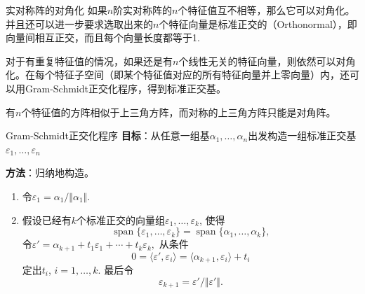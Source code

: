 
\begin{frame}

\begin{block}{实对称阵的对角化}
如果$n$阶实对称阵的$n$个特征值互不相等，那么它可以对角化。并且还可以进一步要求选取出来的$n$个特征向量是标准正交的（Orthonormal），即向量间相互正交，而且每个向量长度都等于1.

\vspace{1em}
\pause

对于有重复特征值的情况，如果还是有$n$个线性无关的特征向量，则依然可以对角化。在每个特征子空间（即某个特征值对应的所有特征向量并上零向量）内，还可以用Gram-Schmidt正交化程序，得到标准正交基。

\vspace{1em}
\pause

有$n$个特征值的方阵相似于上三角方阵，而对称的上三角方阵只能是对角阵。
\end{block}

\end{frame}


\begin{frame}

\begin{block}{Gram-Schmidt正交化程序}
{\bfseries 目标}：从任意一组基$\alpha_1, \ldots, \alpha_n$出发构造一组标准正交基$\varepsilon_1, \ldots, \varepsilon_n$

\vspace{1em}
\pause

{\bfseries 方法}：归纳地构造。
\begin{enumerate}
\item 令$\varepsilon_1 = \alpha_1 / \Vert \alpha_1 \Vert$.
\item 假设已经有$k$个标准正交的向量组$\varepsilon_1, \ldots, \varepsilon_k$, 使得
\[\operatorname{span}\{ \varepsilon_1, \ldots, \varepsilon_k \} = \operatorname{span}\{ \alpha_1, \ldots, \alpha_k \},\]
令$\varepsilon' = \alpha_{k+1} + t_1\varepsilon_1 + \cdots + t_k\varepsilon_k,$ 从条件
\[0 = \langle \varepsilon', \varepsilon_i \rangle = \langle \alpha_{k+1}, \varepsilon_i \rangle + t_i\]
定出$t_i$, $i=1,\ldots,k$. 最后令
\[\varepsilon_{k+1} = \varepsilon' / \Vert \varepsilon' \Vert.\]
\end{enumerate}
\end{block}

\end{frame}

